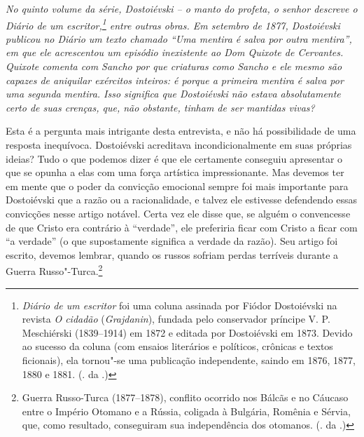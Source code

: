 \medskip

\emph{No quinto volume da série, \emph{Dostoiévski -- o manto do profeta}, o
senhor descreve o \emph{Diário de um escritor},\footnote{\emph{Diário de um escritor} foi uma coluna assinada por Fiódor Dostoiévski na revista \emph{O cidadão} (\emph{Grajdanin}), fundada pelo conservador príncipe V. P. Meschiérski (1839--1914) em 1872 e editada por Dostoiévski em 1873. Devido ao sucesso da coluna (com ensaios literários e políticos, crônicas e textos ficionais), ela tornou"-se uma publicação independente, saindo em 1876, 1877, 1880 e 1881. (. da .)} entre outras obras.
Em setembro de 1877, Dostoiévski publicou no \emph{Diário} um texto
chamado ``Uma mentira é salva por outra mentira'', em que ele acrescentou
um episódio inexistente ao \emph{Dom Quixote} de Cervantes. Quixote comenta
com Sancho por que criaturas como Sancho e ele mesmo são capazes de aniquilar exércitos
inteiros: é porque a primeira mentira é salva por uma segunda mentira.
Isso significa que Dostoiévski não estava absolutamente certo de suas
crenças, que, não obstante, tinham de ser mantidas vivas?}

Esta é a pergunta mais intrigante desta entrevista, e não há
possibilidade de uma resposta inequívoca. Dostoiévski acreditava
incondicionalmente em suas próprias ideias? Tudo o que podemos dizer é
que ele certamente conseguiu apresentar o que se opunha a elas com uma
força artística impressionante. Mas devemos ter em mente que o poder da
convicção emocional sempre foi mais importante para Dostoiévski que a
razão ou a racionalidade, e talvez ele estivesse defendendo essas
convicções nesse artigo notável. Certa vez ele disse que, se alguém o
convencesse de que Cristo era contrário à ``verdade'', ele preferiria ficar
com Cristo a ficar com ``a verdade'' (o que supostamente significa a
verdade da razão). Seu artigo foi escrito, devemos lembrar, quando os
russos sofriam perdas terríveis durante a Guerra Russo"-Turca.\footnote{Guerra Russo-Turca (1877--1878), conflito ocorrido nos Bálcãs e no Cáucaso entre o Império Otomano e a Rússia, coligada à Bulgária, Romênia e Sérvia, que, como resultado, conseguiram sua independência dos otomanos. (. da .)}

\bigskip



